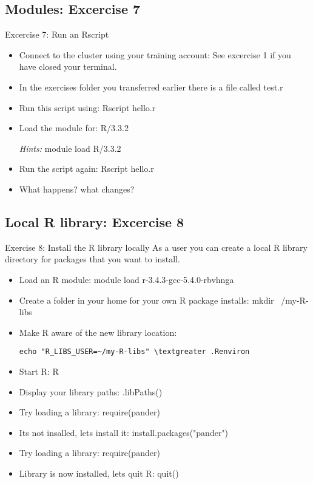 \subsection{Modules: Excercise 7}
\begin{frame}[fragile]{Excercise 7: Run an Rscript}
\begin{itemize}
\item{Connect to the cluster using your training account: See excercise 1 if you have closed your terminal.}
\item{In the exercises folder you transferred earlier there is a file called test.r}
\item{Run this script using: Rscript hello.r }
\item{Load the module for: R/3.3.2}
\item[\emph{Hints:}]{\alert{module load R/3.3.2}}
\item{Run the script again: Rscript hello.r}
\item{What happens? what changes?}
\end{itemize}
\end{frame}

\subsection{Local R library: Excercise 8}
\begin{frame}[fragile]{Exercise 8: Install the R library locally}
As a user you can create a local R library directory for packages that you want to install. 
\begin{itemize}
\item Load an R module: 
module load r-3.4.3-gcc-5.4.0-rbvhnga
\item Create a folder in your home for your own R package installs:
mkdir ~/my-R-libs
\item Make R aware of the new library location:
\begin{verbatim}
echo "R_LIBS_USER=~/my-R-libs" \textgreater .Renviron
\end{verbatim}
\item Start R:
R
\item Display your library paths:
.libPaths()
\item Try loading a library:
require(pander)
\item Its not insalled, lets install it:
install.packages("pander")
\item Try loading a library:
require(pander)
\item Library is now installed, lets quit R:
quit()
\end{itemize}
\end{frame}

